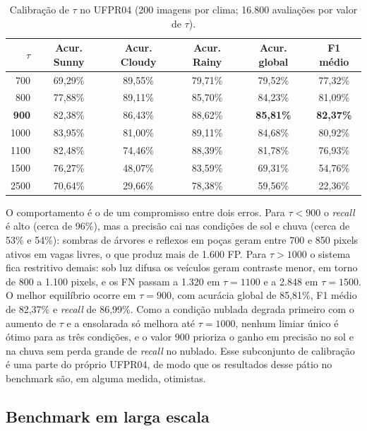 \documentclass[
	article,			%
	11pt,				%
	oneside,			%
	a4paper,			%
	english,			%
	brazil,				%
	sumario=tradicional
	]{abntex2}
\begin{document}
\begin{table}[htbp]
\centering
\caption{Calibração de $\tau$ no UFPR04 (200 imagens por clima; 16.800 avaliações por valor de $\tau$).}
\label{tab:calibracao}
\small
\begin{tabular}{rccccc}
\toprule
$\tau$ & Acur. Sunny & Acur. Cloudy & Acur. Rainy & \textbf{Acur. global} & \textbf{F1 médio} \\
\midrule
700  & 69,29\% & 89,55\% & 79,71\% & 79,52\% & 77,32\% \\
800  & 77,88\% & 89,11\% & 85,70\% & 84,23\% & 81,09\% \\
\textbf{900}  & 82,38\% & 86,43\% & 88,62\% & \textbf{85,81\%} & \textbf{82,37\%} \\
1000 & 83,95\% & 81,00\% & 89,11\% & 84,68\% & 80,92\% \\
1100 & 82,48\% & 74,46\% & 88,39\% & 81,78\% & 76,93\% \\
1500 & 76,27\% & 48,07\% & 83,59\% & 69,31\% & 54,76\% \\
2500 & 70,64\% & 29,66\% & 78,38\% & 59,56\% & 22,36\% \\
\bottomrule
\end{tabular}
\end{table}

O comportamento é o de um compromisso entre dois erros. Para $\tau<900$ o \textit{recall} é alto (cerca de 96\%), mas a precisão cai nas condições de sol e chuva (cerca de 53\% e 54\%): sombras de árvores e reflexos em poças geram entre 700 e 850 pixels ativos em vagas livres, o que produz mais de 1.600 FP. Para $\tau>1000$ o sistema fica restritivo demais: sob luz difusa os veículos geram contraste menor, em torno de 800 a 1.100 pixels, e os FN passam a 1.320 em $\tau=1100$ e a 2.848 em $\tau=1500$. O melhor equilíbrio ocorre em $\tau=900$, com acurácia global de 85,81\%, F1 médio de 82,37\% e \textit{recall} de 86,99\%. Como a condição nublada degrada primeiro com o aumento de $\tau$ e a ensolarada só melhora até $\tau=1000$, nenhum limiar único é ótimo para as três condições, e o valor 900 prioriza o ganho em precisão no sol e na chuva sem perda grande de \textit{recall} no nublado. Esse subconjunto de calibração é uma parte do próprio UFPR04, de modo que os resultados desse pátio no benchmark são, em alguma medida, otimistas.

\subsection{Benchmark em larga escala}
\end{document}
